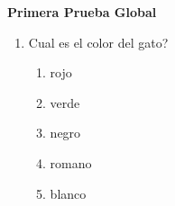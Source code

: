 \documentclass[12pt,oneside,letterpaper]{article}
\begin{document}
	\begin{center}
	\Large\textbf{Primera Prueba Global}
	\end{center}

	\begin{enumerate}
		\item Cual es el color del gato?
		\begin{enumerate}
			\item rojo
			\item verde
			\item negro
			\item romano
			\item blanco
		\end{enumerate}
	\end{enumerate}
\end{document}
